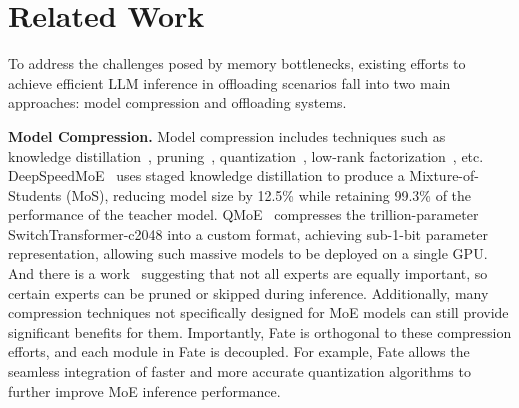 \section{Related Work}
To address the challenges posed by memory bottlenecks, existing efforts to achieve efficient LLM inference in offloading scenarios fall into two main approaches: model compression and offloading systems.

\textbf{Model Compression.} Model compression includes techniques such as knowledge distillation~\cite{agarwal2023gkd, gu2023knowledge, li2023symbolic}, pruning~\cite{frantar2023sparsegpt, ma2023llm, sun2023simple}, quantization~\cite{frantar2022gptq, lin2024awq, xiao2023smoothquant}, low-rank factorization~\cite{xu2023tensorgpt}, etc. DeepSpeedMoE~\cite{rajbhandari2022deepspeed} uses staged knowledge distillation to produce a Mixture-of-Students (MoS), reducing model size by 12.5\% while retaining 99.3\% of the performance of the teacher model. QMoE~\cite{frantar2023qmoe} compresses the trillion-parameter SwitchTransformer-c2048 into a custom format, achieving sub-1-bit parameter representation, allowing such massive models to be deployed on a single GPU. And there is a work~\cite{lu2024not} suggesting that not all experts are equally important, so certain experts can be pruned or skipped during inference. 
Additionally, many compression techniques not specifically designed for MoE models can still provide significant benefits for them. Importantly, Fate is orthogonal to these compression efforts, and each module in Fate is decoupled. For example, Fate allows the seamless integration of faster and more accurate quantization algorithms to further improve MoE inference performance.

